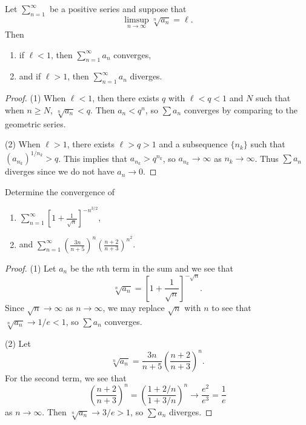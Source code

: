 \begin{theorem}
  Let $\sum_{n = 1}^\infty$ be a positive series and
  suppose that
  \[\limsup_{n \to \infty} \sqrt[n]{a_n} = \ell.\]
  Then
  \begin{enumerate}
    \item if $\ell < 1$, then $\sum_{n = 1}^\infty a_n$ converges,
    \item and if $\ell > 1$, then $\sum_{n = 1}^\infty a_n$ diverges.
  \end{enumerate}
\end{theorem}

\begin{proof}
  (1) When $\ell < 1$, then there exists $q$ with
  $\ell < q < 1$ and $N$ such that when $n \ge N$,
  $\sqrt[n]{a_n} < q$. Then $a_n < q^n$,
  so $\sum a_n$ converges by comparing to the
  geometric series.

  (2) When $\ell > 1$, there exists $\ell > q > 1$ and
  a subsequence $\{n_k\}$ such that
  $(a_{n_k})^{1 / n_k} > q$. This implies that
  $a_{n_k} > q^{n_k}$, so $a_{n_k} \to \infty$ as
  $n_k \to \infty$. Thus $\sum a_n$ diverges since
  we do not have $a_n \to 0$.
\end{proof}

\begin{example}
  Determine the convergence of
  \begin{enumerate}
    \item $\displaystyle \sum_{n =1 }^\infty \left[1 + \frac{1}{\sqrt{n}}\right]^{-n^{3 / 2}}$,
    \item and $\displaystyle \sum_{n = 1}^\infty \left(\frac{3n}{n + 5}\right)^n \left(\frac{n + 2}{n + 3}\right)^{n^2}$.
  \end{enumerate}
\end{example}

\begin{proof}
  (1) Let $a_n$ be the $n$th term in the sum and we
  see that
  \[
    \sqrt[n]{a_n} =
    \left[1 + \frac{1}{\sqrt{n}}\right]^{-\sqrt{n}}.
  \]
  Since $\sqrt{n} \to \infty$ as $n \to \infty$, we
  may replace $\sqrt{n}$ with $n$ to see that
  $\sqrt[n]{a_n} \to 1 / e < 1$, so
  $\sum a_n$ converges.

  (2) Let
  \[
    \sqrt[n]{a_n} = \frac{3n}{n + 5} \left(\frac{n + 2}{n + 3}\right)^n.
  \]
  For the second term, we see that
  \[
    \left(\frac{n + 2}{n + 3}\right)^n
    = \left(\frac{1 + 2 / n}{1 + 3 / n}\right)^n
    \longrightarrow \frac{e^2}{e^3} = \frac{1}{e}
  \]
  as $n \to \infty$.
  Then $\sqrt[n]{a_n} \to 3 / e > 1$, so
  $\sum a_n$ diverges.
\end{proof}
